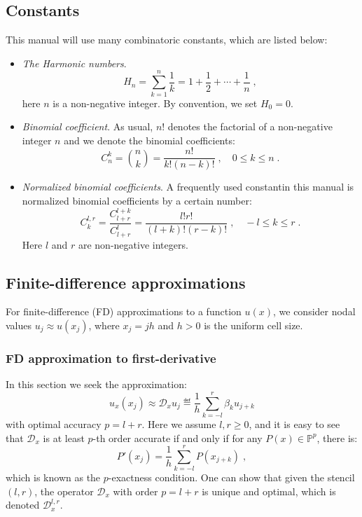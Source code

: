 \subsection{Constants}
\label{sec:bg_cnst}
This manual will use many combinatoric constants, which are listed below:
\begin{itemize}
  \item {\it The Harmonic numbers}.
    \begin{equation}\label{eq:bg_cnst_harm}
      H_n = \sum_{k=1}^n\frac{1}{k} = 1 + \frac{1}{2} + \cdots + \frac{1}{n}\;,
    \end{equation}
    here $n$ is a non-negative integer.
    By convention, we set $H_0=0$.
  \item {\it Binomial coefficient}.
    As usual, $n!$ denotes the factorial of a non-negative integer $n$ and we denote the binomial coefficients:
    \begin{equation}\label{eq:bg_cnst_binom}
      C_n^k = \binom{n}{k} = \frac{n!}{k!(n-k)!}\;,\quad 0\le k\le n\;.
    \end{equation}
  \item {\it Normalized binomial coefficients}.
    A frequently used constantin this manual is normalized binomial coefficients by a certain number:
    \begin{equation}\label{eq:bg_cnst_brat}
      C^{l,r}_k = \frac{C_{l+r}^{l+k}}{C_{l+r}^l} = \frac{l!r!}{(l+k)!(r-k)!}\;,\quad -l\le k\le r\;.
    \end{equation}
    Here $l$ and $r$ are non-negative integers.
\end{itemize}


\subsection{Finite-difference approximations}
\label{sec:bg_fd}
For finite-difference (FD) approximations to a function $u(x)$, we consider nodal values $u_j\approx u(x_j)$, where $x_j=jh$ and $h>0$ is the uniform cell size.

\subsubsection{FD approximation to first-derivative}
\label{sec:bg_fd_dx}
In this section we seek the approximation:
\begin{equation}\label{eq:bg_fd_dx}
  u_x(x_j) \approx \mathcal{D}_xu_j\eqdef \frac{1}{h}\sum_{k=-l}^r\beta_ku_{j+k}
\end{equation}
with optimal accuracy $p=l+r$.
Here we assume $l,r\ge0$, and it is easy to see that $\mathcal{D}_x$ is at least $p$-th order accurate if and only if for any $P(x)\in\mathbb{P}^p$, there is:
\begin{equation}\label{eq:bg_fd_dx_pexact}
  P'(x_j) = \frac{1}{h}\sum_{k=-l}^rP(x_{j+k})\;,
\end{equation}
which is known as the $p$-exactness condition.
One can show that given the stencil $(l,r)$, the operator $\mathcal{D}_x$ with order $p=l+r$ is unique and optimal, which is denoted $\mathcal{D}_x^{l,r}$.

